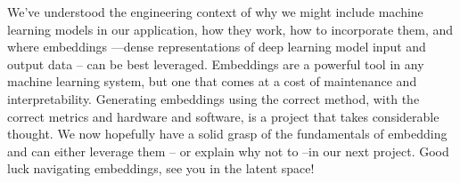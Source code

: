 \documentclass[11pt, table]{diazessay} %
\begin{document}
\begin{sloppypar}
We've understood the engineering context of why we might include machine learning models in our application, how they work, how to incorporate them, and where embeddings ---dense representations of deep learning model input and output data -- can be best leveraged.  Embeddings are a powerful tool in any machine learning system, but one that comes at a cost of maintenance and interpretability. Generating embeddings using the correct method, with the correct metrics and hardware and software, is a project that takes considerable thought.  We now hopefully have a solid grasp of the fundamentals of embedding and can either leverage them -- or explain why not to --in our next project.
Good luck navigating embeddings, see you in the latent space!


\newpage


\newpage



\end{sloppypar}
\end{document}
